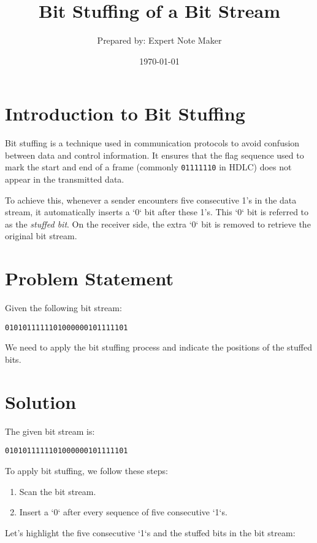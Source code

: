 \documentclass[a4paper,12pt]{article}
\begin{document}
\title{\textbf{Bit Stuffing of a Bit Stream}}
\author{Prepared by: Expert Note Maker}
\date{\today}
\maketitle

\section*{Introduction to Bit Stuffing}
Bit stuffing is a technique used in communication protocols to avoid confusion between data and control information. It ensures that the flag sequence used to mark the start and end of a frame (commonly \texttt{01111110} in HDLC) does not appear in the transmitted data.

To achieve this, whenever a sender encounters five consecutive 1's in the data stream, it automatically inserts a `0` bit after these 1's. This `0` bit is referred to as the \textit{stuffed bit}. On the receiver side, the extra `0` bit is removed to retrieve the original bit stream.

\section*{Problem Statement}
Given the following bit stream:
\begin{center}
    \texttt{0101011111101000000101111101}
\end{center}
We need to apply the bit stuffing process and indicate the positions of the stuffed bits.

\section*{Solution}
The given bit stream is:

\begin{center}
\texttt{0101011111101000000101111101}
\end{center}

To apply bit stuffing, we follow these steps:

\begin{enumerate}
    \item Scan the bit stream.
    \item Insert a `0` after every sequence of five consecutive `1`s.
\end{enumerate}

Let’s highlight the five consecutive `1`s and the stuffed bits in the bit stream:
\end{document}

